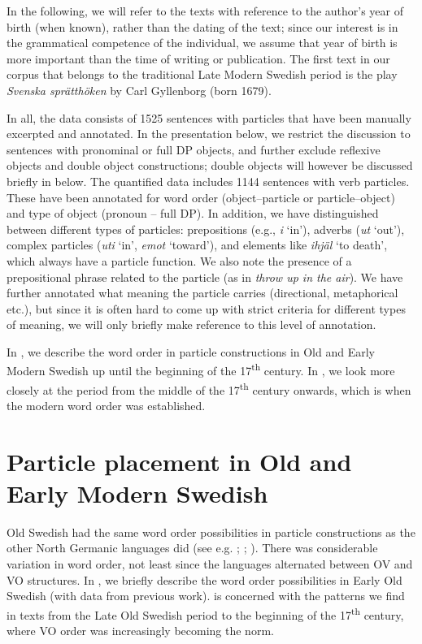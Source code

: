 \documentclass[output=paper]{langscibook}
\begin{document}
In the following, we will refer to the texts with reference to the author’s year of birth (when known), rather than the dating of the text; since our interest is in the grammatical competence of the individual, we assume that year of birth is more important than the time of writing or publication. The first text in our corpus that belongs to the traditional Late Modern Swedish period is the play \textit{Svenska sprätthöken} by Carl Gyllenborg (born 1679). 



In all, the data consists of 1525 sentences with particles that have been manually excerpted and annotated. In the presentation below, we restrict the discussion to sentences with pronominal or full DP objects, and further exclude reflexive objects and double object constructions; double objects will however be discussed briefly in  below. The quantified data includes 1144 sentences with verb particles. These have been annotated for word order (object–particle or particle–object) and type of object (pronoun – full DP). In addition, we have distinguished between different types of particles: prepositions (e.g., \textit{i} ‘in’), adverbs (\textit{ut} ‘out’), complex particles (\textit{uti} ‘in’, \textit{emot} ‘toward’), and elements like \textit{ihjäl} ‘to death’, which always have a particle function. We also note the presence of a prepositional phrase related to the particle (as in \textit{throw up in the air}). We have further annotated what meaning the particle carries (directional, metaphorical etc.), but since it is often hard to come up with strict criteria for different types of meaning, we will only briefly make reference to this level of annotation.



In , we describe the word order in particle constructions in Old and Early Modern Swedish up until the beginning of the 17\textsuperscript{th} century. In , we look more closely at the period from the middle of the 17\textsuperscript{th} century onwards, which is when the modern word order was established.


\section{Particle placement in Old and Early Modern Swedish}\label{sec:lalu:4}


Old Swedish had the same word order possibilities in particle constructions as the other North Germanic languages did (see e.g. \citealt{Ljunggren1932}; \citealt{Diderichsen1941}; \citealt{Hroarsdottir2008}). There was considerable variation in word order, not least since the languages alternated between OV and VO structures. In , we briefly describe the word order possibilities in Early Old Swedish (with data from previous work).  is concerned with the patterns we find in texts from the Late Old Swedish period to the beginning of the 17\textsuperscript{th} century, where VO order was increasingly becoming the norm.
\end{document}
